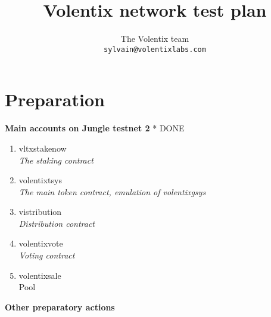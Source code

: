 \documentclass[]{article}
\title{Volentix network test plan}
\author{
		The Volentix team\\
	\texttt{sylvain@volentixlabs.com}
}
\begin{document}
\maketitle


\section{Preparation}

\textbf{Main accounts on Jungle testnet 2}  * {\color{green} DONE}
	
  \begin{enumerate}
  \item  vltxstakenow\\
\textit{  The staking contract}
  \item volentixtsys \\
  \textit{  The main token contract, emulation of volentixgsys}
  \item vistribution\\
  \textit{Distribution contract}
  \item volentixvote \\
  \textit{  Voting contract}
    \item volentixsale \\
		Pool
 
\end{enumerate}
 \textbf{Other preparatory actions}
\end{document}
